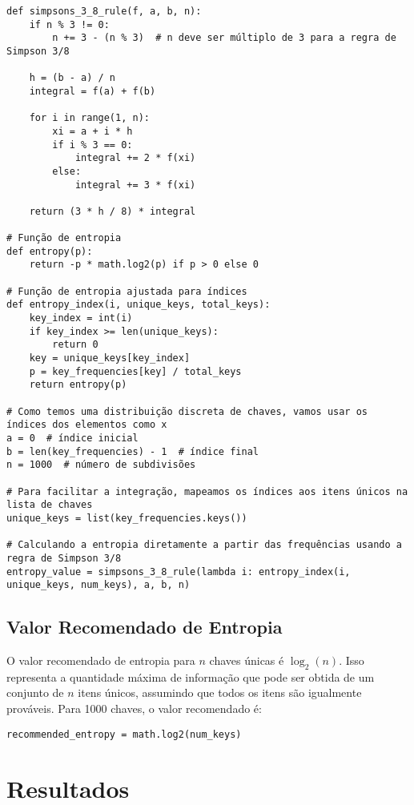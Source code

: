 \documentclass{article}
\begin{document}
\begin{verbatim}
def simpsons_3_8_rule(f, a, b, n):
    if n % 3 != 0:
        n += 3 - (n % 3)  # n deve ser múltiplo de 3 para a regra de Simpson 3/8

    h = (b - a) / n
    integral = f(a) + f(b)

    for i in range(1, n):
        xi = a + i * h
        if i % 3 == 0:
            integral += 2 * f(xi)
        else:
            integral += 3 * f(xi)

    return (3 * h / 8) * integral

# Função de entropia
def entropy(p):
    return -p * math.log2(p) if p > 0 else 0

# Função de entropia ajustada para índices
def entropy_index(i, unique_keys, total_keys):
    key_index = int(i)
    if key_index >= len(unique_keys):
        return 0
    key = unique_keys[key_index]
    p = key_frequencies[key] / total_keys
    return entropy(p)

# Como temos uma distribuição discreta de chaves, vamos usar os índices dos elementos como x
a = 0  # índice inicial
b = len(key_frequencies) - 1  # índice final
n = 1000  # número de subdivisões

# Para facilitar a integração, mapeamos os índices aos itens únicos na lista de chaves
unique_keys = list(key_frequencies.keys())

# Calculando a entropia diretamente a partir das frequências usando a regra de Simpson 3/8
entropy_value = simpsons_3_8_rule(lambda i: entropy_index(i, unique_keys, num_keys), a, b, n)
\end{verbatim}

    \subsection{Valor Recomendado de Entropia}

    O valor recomendado de entropia para \( n \) chaves únicas é \( \log_2(n) \). Isso representa a quantidade máxima de informação que pode ser obtida de um conjunto de \( n \) itens únicos, assumindo que todos os itens são igualmente prováveis. Para 1000 chaves, o valor recomendado é:

    \begin{verbatim}
recommended_entropy = math.log2(num_keys)
    \end{verbatim}

    \section{Resultados}
\end{document}
